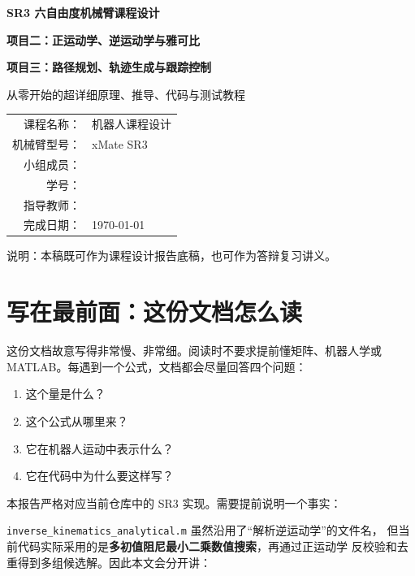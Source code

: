 \documentclass[UTF8,a4paper,12pt,openany]{ctexbook}
\begin{document}
\begin{titlepage}
  \centering
  \vspace*{1.5cm}
  {\Huge\bfseries SR3 六自由度机械臂课程设计\par}
  \vspace{0.8cm}
  {\LARGE\bfseries 项目二：正运动学、逆运动学与雅可比\par}
  \vspace{0.3cm}
  {\LARGE\bfseries 项目三：路径规划、轨迹生成与跟踪控制\par}
  \vspace{1.2cm}
  {\Large 从零开始的超详细原理、推导、代码与测试教程\par}
  \vfill
  \begin{tabular}{rl}
    课程名称：& 机器人课程设计\\[0.35cm]
    机械臂型号：& xMate SR3\\[0.35cm]
    小组成员：& \underline{\hspace{8cm}}\\[0.35cm]
    学号：& \underline{\hspace{8cm}}\\[0.35cm]
    指导教师：& \underline{\hspace{8cm}}\\[0.35cm]
    完成日期：& \today
  \end{tabular}
  \vfill
  {\large 说明：本稿既可作为课程设计报告底稿，也可作为答辩复习讲义。}
\end{titlepage}

\frontmatter
\chapter*{写在最前面：这份文档怎么读}

这份文档故意写得非常慢、非常细。阅读时不要求提前懂矩阵、机器人学或
MATLAB。每遇到一个公式，文档都会尽量回答四个问题：

\begin{enumerate}
  \item 这个量是什么？
  \item 这个公式从哪里来？
  \item 它在机器人运动中表示什么？
  \item 它在代码中为什么要这样写？
\end{enumerate}

本报告严格对应当前仓库中的 SR3 实现。需要提前说明一个事实：

\nolinkurl{inverse_kinematics_analytical.m} 虽然沿用了“解析逆运动学”的文件名，
但当前代码实际采用的是\textbf{多初值阻尼最小二乘数值搜索}，再通过正运动学
反校验和去重得到多组候选解。因此本文会分开讲：
\end{document}
